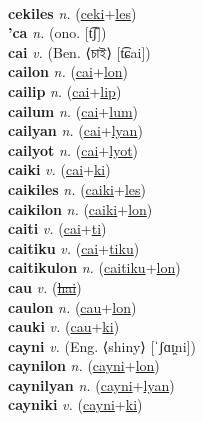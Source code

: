  \label{ceki} \\
\textbf{cekiles} \textit{n.} (\hyperref[ceki]{ceki}+\hyperref[les]{les})
 \label{cekiles} \\
\textbf{'ca} \textit{n.} (ono. [t͡ʃ])
 \label{'ca} \\
\textbf{cai} \textit{v.} (Ben. ⟨চাই⟩ [t͡ɕai])
 \label{cai} \\
\textbf{cailon} \textit{n.} (\hyperref[cai]{cai}+\hyperref[lon]{lon})
 \label{cailon} \\
\textbf{cailip} \textit{n.} (\hyperref[cai]{cai}+\hyperref[lip]{lip})
 \label{cailip} \\
\textbf{cailum} \textit{n.} (\hyperref[cai]{cai}+\hyperref[lum]{lum})
 \label{cailum} \\
\textbf{cailyan} \textit{n.} (\hyperref[cai]{cai}+\hyperref[lyan]{lyan})
 \label{cailyan} \\
\textbf{cailyot} \textit{n.} (\hyperref[cai]{cai}+\hyperref[lyot]{lyot})
 \label{cailyot} \\
\textbf{caiki} \textit{v.} (\hyperref[cai]{cai}+\hyperref[ki]{ki})
 \label{caiki} \\
\textbf{caikiles} \textit{n.} (\hyperref[caiki]{caiki}+\hyperref[les]{les})
 \label{caikiles} \\
\textbf{caikilon} \textit{n.} (\hyperref[caiki]{caiki}+\hyperref[lon]{lon})
 \label{caikilon} \\
\textbf{caiti} \textit{v.} (\hyperref[cai]{cai}+\hyperref[ti]{ti})
 \label{caiti} \\
\textbf{caitiku} \textit{v.} (\hyperref[cai]{cai}+\hyperref[tiku]{tiku})
 \label{caitiku} \\
\textbf{caitikulon} \textit{n.} (\hyperref[caitiku]{caitiku}+\hyperref[lon]{lon})
 \label{caitikulon} \\
\textbf{cau} \textit{v.} (\hyperref[hai]{\sout{hai}})
 \label{cau} \\
\textbf{caulon} \textit{n.} (\hyperref[cau]{cau}+\hyperref[lon]{lon})
 \label{caulon} \\
\textbf{cauki} \textit{v.} (\hyperref[cau]{cau}+\hyperref[ki]{ki})
 \label{cauki} \\
\textbf{cayni} \textit{v.} (Eng. ⟨shiny⟩ [ˈʃɑɪ̯ni])
 \label{cayni} \\
\textbf{caynilon} \textit{n.} (\hyperref[cayni]{cayni}+\hyperref[lon]{lon})
 \label{caynilon} \\
\textbf{caynilyan} \textit{n.} (\hyperref[cayni]{cayni}+\hyperref[lyan]{lyan})
 \label{caynilyan} \\
\textbf{cayniki} \textit{v.} (\hyperref[cayni]{cayni}+\hyperref[ki]{ki})
